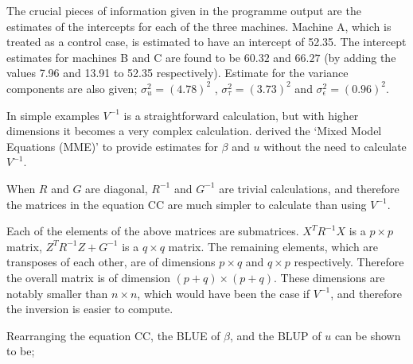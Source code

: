 \documentclass[12pt, a4paper]{report}
\theoremstyle{plain}
\theoremstyle{definition}
\theoremstyle{remark}
\begin{document}
The crucial pieces of information given in the programme output
are the estimates of the intercepts for each of the three
machines. Machine A, which is treated as a control case, is
estimated to have an intercept of 52.35. The intercept estimates
for machines B and C are found to be $60.32$ and $66.27$ (by
adding the values 7.96 and 13.91 to 52.35 respectively). Estimate
for the variance components are also given; $\sigma^{2}_{u} =
(4.78)^{2}$ , $\sigma^{2}_{\tau} = (3.73)^{2}$ and
$\sigma^{2}_{\epsilon} = (0.96)^{2}$.




In simple examples $V^{-1}$ is a straightforward calculation, but
with higher dimensions it becomes a very complex calculation.
\citet{Henderson50, Henderson63, Henderson73, Henderson84a}
derived the `Mixed Model Equations (MME)' to provide estimates for
$\beta$ and $u$ without the need to calculate $V^{-1}$.


When $R$ and $G$ are diagonal, $R^{-1}$ and $G^{-1}$ are trivial
calculations, and therefore the matrices in the equation CC are
much simpler to calculate than using $V^{-1}$.

Each of the elements of the above matrices are submatrices.
$X^{T}R^{-1}X$ is a $p \times p$ matrix, $Z^{T}R^{-1}Z + G^{-1}$
is a $q \times q$ matrix. The remaining elements, which are
transposes of each other, are of dimensions $p \times q$ and $q
\times p$ respectively. Therefore the overall matrix is of
dimension $(p+q) \times (p+q)$. These dimensions are notably
smaller than $n \times n$, which would have been the case if
$V^{-1}$, and therefore the inversion is easier to compute.

Rearranging the equation CC, the BLUE of $\beta$, and the BLUP of
$u$ can be shown to be;
\end{document}
